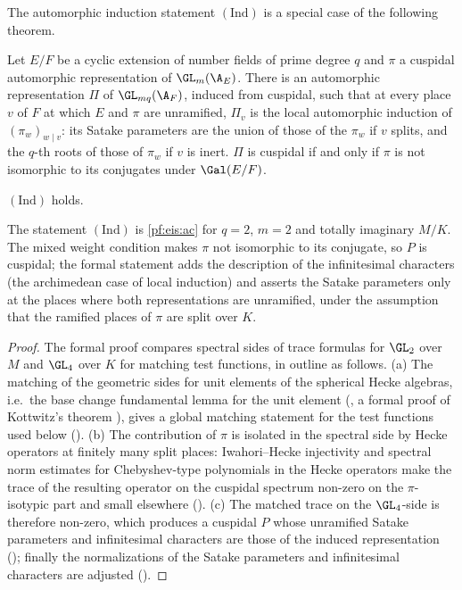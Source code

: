 The automorphic induction statement $(\mathrm{Ind})$ is a special case of the following theorem.

\begin{littheorem}\label{pf:eis:ac}
Let $E/F$ be a cyclic extension of number fields of prime degree $q$ and $\pi$ a cuspidal automorphic representation of $\GL_m(\A_E)$. There is an
automorphic representation $\Pi$ of $\GL_{mq}(\A_F)$, induced from cuspidal, such that at every place $v$ of $F$ at which $E$ and $\pi$ are
unramified, $\Pi_v$ is the local automorphic induction of $(\pi_w)_{w\mid v}$: its Satake parameters are the union of those of the $\pi_w$ if $v$ splits,
and the $q$-th roots of those of $\pi_w$ if $v$ is inert. $\Pi$ is cuspidal if and only if $\pi$ is not isomorphic to its conjugates under $\Gal(E/F)$.
\end{littheorem}

\begin{theorem}\label{pf:eis:ind}
$(\mathrm{Ind})$ holds.
\end{theorem}

The statement $(\mathrm{Ind})$ is \cref{pf:eis:ac} for $q=2$, $m=2$ and totally imaginary $M/K$. The mixed weight condition makes $\pi$ not isomorphic
to its conjugate, so $P$ is cuspidal; the formal statement adds the description of the infinitesimal characters (the archimedean case of
local induction) and asserts the Satake parameters only at the places where both representations are unramified, under the assumption
that the ramified places of $\pi$ are split over $K$.

\begin{proof}
The formal proof compares spectral sides of trace formulas for $\GL_2$ over $M$ and $\GL_4$ over $K$ for matching test functions, in outline as
follows. (a) The matching of the geometric sides for unit elements of the spherical Hecke algebras, i.e.\ the base change fundamental lemma
for the unit element (, a formal proof of Kottwitz's theorem \cite{Kottwitz1986}), gives a
global matching statement for the test functions used below (). (b) The contribution of
$\pi$ is isolated in the spectral side by Hecke operators at finitely many split places: Iwahori--Hecke injectivity and spectral norm
estimates for Chebyshev-type polynomials in the Hecke operators make the trace of the resulting operator on the cuspidal spectrum
non-zero on the $\pi$-isotypic part and small elsewhere (). (c) The
matched trace on the $\GL_4$-side is therefore non-zero, which produces a cuspidal $P$ whose unramified Satake parameters and
infinitesimal characters are those of the induced representation
(); finally the normalizations of the Satake parameters and
infinitesimal characters are adjusted ().
\end{proof}
